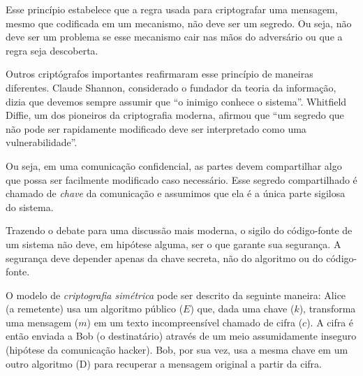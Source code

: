 Esse princípio estabelece que a regra usada para criptografar uma mensagem, mesmo que codificada em um mecanismo, não deve ser um segredo.
Ou seja, não deve ser um problema se esse mecanismo cair nas mãos do adversário ou que a regra seja descoberta.

Outros criptógrafos importantes reafirmaram esse princípio de maneiras diferentes.
Claude Shannon, considerado o fundador da teoria da informação, dizia que devemos sempre assumir que ``o inimigo conhece o sistema''.
Whitfield Diffie, um dos pioneiros da criptografia moderna, afirmou que ``um segredo que não pode ser rapidamente modificado deve ser interpretado como uma vulnerabilidade''.

Ou seja, em uma comunicação confidencial, as partes devem compartilhar algo que possa ser facilmente modificado caso necessário.
Esse segredo compartilhado é chamado de {\em chave} da comunicação e assumimos que ela é a única parte sigilosa do sistema.

Trazendo o debate para uma discussão mais moderna, o sigilo do código-fonte de um sistema não deve, em hipótese alguma, ser o que garante sua segurança.
A segurança deve depender apenas da chave secreta, não do algoritmo ou do código-fonte.

O modelo de {\em criptografia simétrica} pode ser descrito da seguinte maneira:
Alice (a remetente) usa um algoritmo público ($E$) que, dada uma chave ($k$), transforma uma mensagem ($m$) em um texto incompreensível chamado de cifra ($c$).
A cifra é então enviada a Bob (o destinatário) através de um meio assumidamente inseguro (hipótese da comunicação hacker).
Bob, por sua vez, usa a mesma chave em um outro algoritmo (D) para recuperar a mensagem original a partir da cifra.

\begin{center}
\end{center}

